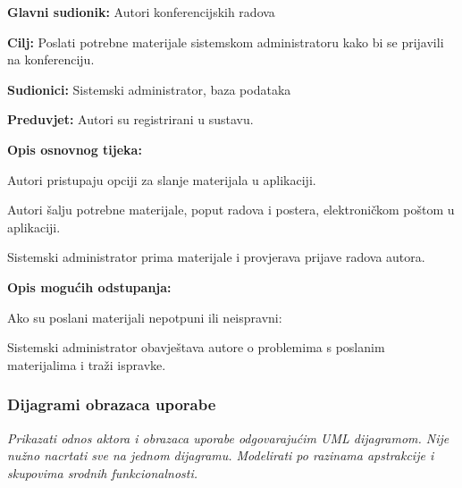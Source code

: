 					\noindent {}
					\begin{packed_item}
						\item \textbf{Glavni sudionik:} Autori konferencijskih radova
						\item \textbf{Cilj:} Poslati potrebne materijale sistemskom administratoru kako bi se prijavili na konferenciju.
						\item \textbf{Sudionici:} Sistemski administrator, baza podataka
						\item \textbf{Preduvjet:} Autori su registrirani u sustavu.
						\item \textbf{Opis osnovnog tijeka:}
						
						\begin{packed_enum}
							\item Autori pristupaju opciji za slanje materijala u aplikaciji.
							\item Autori šalju potrebne materijale, poput radova i postera, elektroničkom poštom u aplikaciji.
							\item Sistemski administrator prima materijale i provjerava prijave radova autora.
						\end{packed_enum}
						
						\item \textbf{Opis mogućih odstupanja:}
						
						\begin{packed_item}
							\item[2.a] Ako su poslani materijali nepotpuni ili neispravni:
							\begin{packed_enum}
								\item Sistemski administrator obavještava autore o problemima s poslanim materijalima i traži ispravke.
							\end{packed_enum}
						\end{packed_item}
					\end{packed_item}
					
				
					
				\subsubsection{Dijagrami obrazaca uporabe}
					
					\textit{Prikazati odnos aktora i obrazaca uporabe odgovarajućim UML dijagramom. Nije nužno nacrtati sve na jednom dijagramu. Modelirati po razinama apstrakcije i skupovima srodnih funkcionalnosti.}
				\eject		
				

